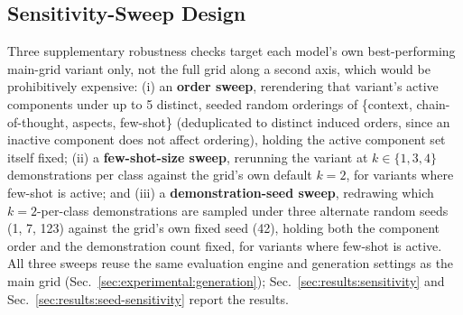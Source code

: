 \subsection{Sensitivity-Sweep Design}
\label{sec:methodology:sweeps}

Three supplementary robustness checks target each model's own
best-performing main-grid variant only, not the full grid along a second
axis, which would be prohibitively expensive: (i) an \textbf{order sweep},
rerendering that variant's active components under up to 5 distinct,
seeded random orderings of \{context, chain-of-thought, aspects,
few-shot\} (deduplicated to distinct induced orders, since an inactive
component does not affect ordering), holding the active component set
itself fixed; (ii) a \textbf{few-shot-size sweep}, rerunning the variant
at $k\in\{1,3,4\}$ demonstrations per class against the grid's own default
$k{=}2$, for variants where few-shot is active; and (iii) a
\textbf{demonstration-seed sweep}, redrawing which $k{=}2$-per-class
demonstrations are sampled under three alternate random seeds (1, 7, 123)
against the grid's own fixed seed (42), holding both the component order
and the demonstration count fixed, for variants where few-shot is active.
All three sweeps reuse the same evaluation engine and generation settings
as the main grid (Sec.~\ref{sec:experimental:generation});
Sec.~\ref{sec:results:sensitivity} and
Sec.~\ref{sec:results:seed-sensitivity} report the results.
